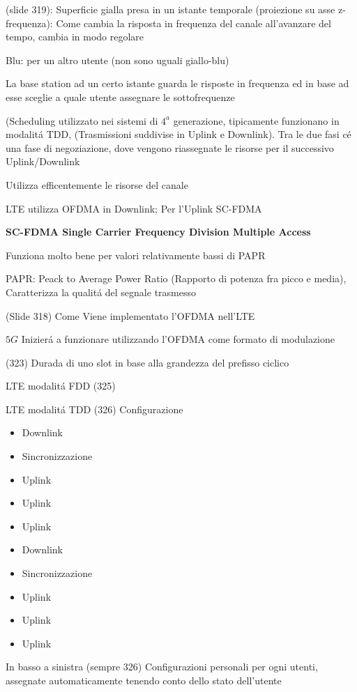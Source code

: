 \documentclass{article}
\begin{document}
(slide 319):
Superficie gialla presa in un istante temporale (proiezione su asse z-frequenza): Come cambia la risposta in frequenza del canale all'avanzare del tempo, cambia in modo regolare

Blu: per un altro utente (non sono uguali giallo-blu)

La base station ad un certo istante guarda le risposte in frequenza ed in base ad esse sceglie a quale utente assegnare le sottofrequenze

(Scheduling utilizzato nei sistemi di $4^a$ generazione, tipicamente funzionano in modalit\'a TDD, (Trasmissioni suddivise in Uplink e Downlink). Tra le due fasi c\'e una fase di negoziazione, dove vengono riassegnate le risorse per il successivo Uplink/Downlink

Utilizza efficentemente le risorse del canale

LTE utilizza OFDMA in Downlink; Per l'Uplink SC-FDMA

\textbf{SC-FDMA Single Carrier Frequency Division Multiple Access}

Funziona molto bene per valori relativamente bassi di PAPR

PAPR: Peack to Average Power Ratio (Rapporto di potenza fra picco e media), Caratterizza la qualit\'a del segnale trasmesso

(Slide 318) Come Viene implementato l'OFDMA nell'LTE

$5G$ Inizier\'a a funzionare utilizzando l'OFDMA come formato di modulazione

(323) Durada di uno slot in base alla grandezza del prefisso ciclico

LTE modalit\'a FDD (325)

LTE modalit\'a TDD (326)
Configurazione
\begin{itemize}
    \item Downlink
    \item Sincronizzazione
    \item Uplink
    \item Uplink
    \item Uplink
    \item Downlink
    \item Sincronizzazione
    \item Uplink
    \item Uplink
    \item Uplink
\end{itemize}

In basso a sinistra (sempre 326) Configurazioni personali per ogni utenti, assegnate automaticamente tenendo conto dello stato dell'utente
\end{document}
